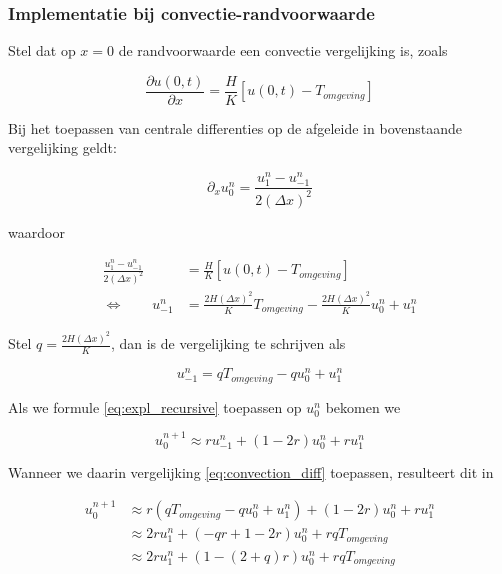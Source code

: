 \documentclass[a4paper,kulak]{kulakarticle} %
\begin{document}
\subsubsection{Implementatie bij convectie-randvoorwaarde}

Stel dat op $x = 0$ de randvoorwaarde een convectie vergelijking is, zoals

\begin{equation*}
	\frac{\partial u(0, t)}{\partial x} = \frac{H}{K}\left[u(0, t) - T_{omgeving}\right]
\end{equation*}

Bij het toepassen van centrale differenties op de afgeleide in bovenstaande vergelijking geldt:

\begin{equation*}
	\partial_x u_0^n = \frac{u_1^n - u_{-1}^n}{2(\Delta x)^2}
\end{equation*}

waardoor

\begin{align*}
	\frac{u_1^n - u_{-1}^n}{2(\Delta x)^2} &= \frac{H}{K}\left[u(0, t) - T_{omgeving}\right] \\
	\Leftrightarrow \qquad
	u_{-1}^n &= 
	\frac{2 H (\Delta x)^2}{K} T_{omgeving} 
	- \frac{2 H (\Delta x)^2}{K} u_0^n
	+ u_1^n
\end{align*}

Stel $q = \frac{2 H (\Delta x)^2}{K}$, dan is de vergelijking te schrijven als

\begin{equation}
	u_{-1}^n = q T_{omgeving} - q u_0^n + u_1^n
	\label{eq:convection_diff}
\end{equation}

Als we formule \ref{eq:expl_recursive} toepassen op $u_0^n$ bekomen we

\begin{equation*}
	u_0^{n+1} \approx r u_{-1}^n + \left( 1 - 2r \right) u_0^n + r u_1^n 
\end{equation*}

Wanneer we daarin vergelijking \ref{eq:convection_diff} toepassen, resulteert dit in

\begin{align*}
	u_0^{n+1} 
	&\approx r \left(q T_{omgeving} - q u_0^n + u_1^n\right) 
	+ \left( 1 - 2r \right) u_0^n 
	+ r u_1^n \\
	&\approx 2 r u_1^n
	+ ( - q r + 1 - 2 r ) u_0^n
	+ r q T_{omgeving} \\
	&\approx 2 r u_1^n
	+ (1 - (2 + q)r) u_0^n
	+ r q T_{omgeving}
\end{align*}
\end{document}
